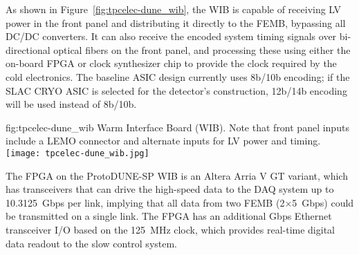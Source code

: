 As shown in Figure~\ref{fig:tpcelec-dune_wib}, the WIB is capable of receiving LV power in the front panel and distributing it directly to the FEMB, bypassing all DC/DC converters.
It can also receive the encoded system timing signals over bi-directional optical
fibers on the front panel, and processing these using either
the on-board FPGA or clock synthesizer chip to provide the clock required by the cold electronics.
The baseline ASIC design currently uses 8b/10b encoding; if the SLAC CRYO ASIC is selected for
the detector's construction, 12b/14b encoding will be used instead of 8b/10b.

\begin{dunefigure}
{fig:tpcelec-dune_wib}
{Warm Interface Board (WIB). Note that front panel inputs include a LEMO connector and alternate inputs for LV power and timing.}
\texttt{[image: tpcelec-dune\_wib.jpg]}
\end{dunefigure}

The FPGA on the ProtoDUNE-SP WIB is an Altera Arria V GT variant, which has
transceivers that can drive the high-speed data to the DAQ system up to
10.3125~Gbps per link, implying that all data from
two FEMB (2$\times$5~Gbps) could be transmitted on a single link.
The FPGA has an additional Gbps Ethernet transceiver I/O based on the 125~MHz clock, which 
provides real-time digital data readout to the slow control system.
